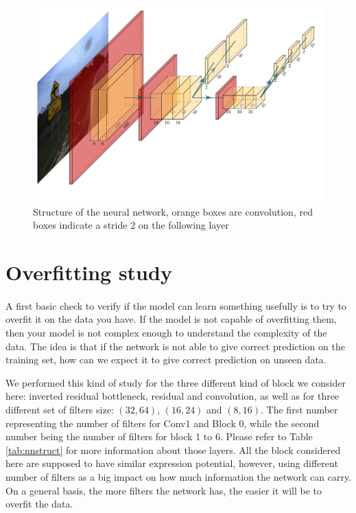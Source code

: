 \begin{figure}
    \centering
    \includegraphics[width=\linewidth]{figures/my_arch}
    \caption{Structure of the neural network, orange boxes are convolution, red boxes indicate a stride 2 on the following layer}
    \label{fig:nnstruct}
\end{figure}{}

\section{Overfitting study} \label{sec:overfit}
\paragraph{}
A first basic check to verify if the model can learn something usefully is to try to overfit it on the data you have. If the model is not capable of overfitting them, then your model is not complex enough to understand the complexity of the data. The idea is that if the network is not able to give correct prediction on the training set, how can we expect it to give correct prediction on unseen data.

We performed this kind of study for the three different kind of block we consider here: inverted residual bottleneck, residual and convolution, as well as for three different set of filters size: $(32,64)$, $(16,24)$ and $(8,16)$. The first number representing the number of filters for Conv1 and Block 0, while the second number being the number of filters for block 1 to 6. Please refer to Table \ref{tab:nnstruct} for more information about those layers. All the block considered here are supposed to have similar expression potential, however, using different number of filters as a big impact on how much information the network can carry. On a general basis, the more filters the network has, the easier it will be to overfit the data.

